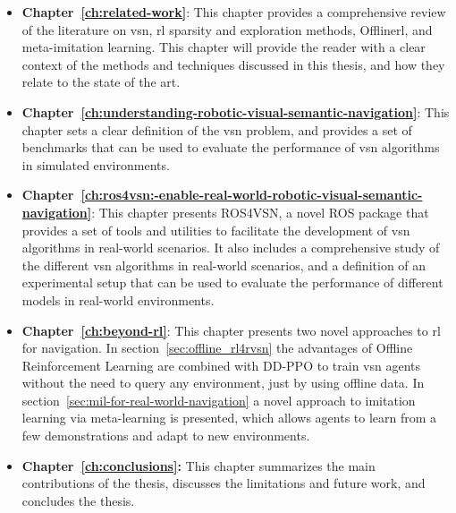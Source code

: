 \begin{itemize}
    \item \textbf{Chapter~\ref{ch:related-work}}: This chapter provides a comprehensive review of the literature on \acrshort{vsn}, \acrshort{rl} sparsity and exploration methods, Offline\acrshort{rl}, and meta-imitation learning.
    This chapter will provide the reader with a clear context of the methods and techniques discussed in this thesis, and how they relate to the state of the art.
    \item \textbf{Chapter~\ref{ch:understanding-robotic-visual-semantic-navigation}}: This chapter sets a clear definition of the \acrshort{vsn} problem, and provides a set of benchmarks that can be used to evaluate the performance of \acrshort{vsn} algorithms in simulated environments.
    \item \textbf{Chapter~\ref{ch:ros4vsn:-enable-real-world-robotic-visual-semantic-navigation}}: This chapter presents ROS4VSN, a novel ROS package that provides a set of tools and utilities to facilitate the development of \acrshort{vsn} algorithms in real-world scenarios.
    It also includes a comprehensive study of the different \acrshort{vsn} algorithms in real-world scenarios, and a definition of an experimental setup that can be used to evaluate the performance of different models in real-world environments.
    \item \textbf{Chapter~\ref{ch:beyond-rl}}: This chapter presents two novel approaches to \acrshort{rl} for navigation.
    In section~\ref{sec:offline_rl4rvsn} the advantages of Offline Reinforcement Learning are combined with DD-PPO to train \acrshort{vsn} agents without the need to query any environment, just by using offline data.
    In section~\ref{sec:mil-for-real-world-navigation} a novel approach to imitation learning via meta-learning is presented, which allows agents to learn from a few demonstrations and adapt to new environments.
    \item \textbf{Chapter~\ref{ch:conclusions}:} This chapter summarizes the main contributions of the thesis, discusses the limitations and future work, and concludes the thesis.
\end{itemize}